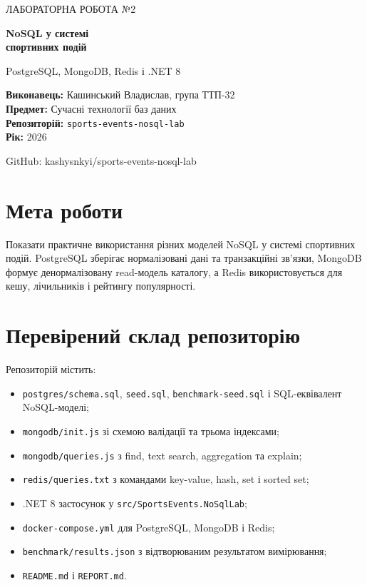 \documentclass[12pt,a4paper]{article}
\begin{document}
\begin{titlepage}
\centering
\vspace*{2.5cm}
{\color{blue}\Large ЛАБОРАТОРНА РОБОТА №2\par}
\vspace{0.8cm}
{\color{navy}\Huge\bfseries NoSQL у системі\\[0.2cm] спортивних подій\par}
\vspace{1.2cm}
{\large PostgreSQL, MongoDB, Redis і .NET 8\par}
\vfill
\begin{flushleft}
\textbf{Виконавець:} Кашинський Владислав, група ТТП-32\\[0.4cm]
\textbf{Предмет:} Сучасні технології баз даних\\[0.4cm]
\textbf{Репозиторій:} \texttt{sports-events-nosql-lab}\\[0.4cm]
\textbf{Рік:} 2026
\end{flushleft}
\vfill
{\color{navy}\large GitHub: kashysnkyi/sports-events-nosql-lab\par}
\end{titlepage}

\section{Мета роботи}

Показати практичне використання різних моделей NoSQL у системі спортивних подій. PostgreSQL зберігає нормалізовані дані та транзакційні зв'язки, MongoDB формує денормалізовану read-модель каталогу, а Redis використовується для кешу, лічильників і рейтингу популярності.

\section{Перевірений склад репозиторію}

Репозиторій містить:

\begin{itemize}
\item \texttt{postgres/schema.sql}, \texttt{seed.sql}, \texttt{benchmark-seed.sql} і SQL-еквівалент NoSQL-моделі;
\item \texttt{mongodb/init.js} зі схемою валідації та трьома індексами;
\item \texttt{mongodb/queries.js} з find, text search, aggregation та explain;
\item \texttt{redis/queries.txt} з командами key-value, hash, set і sorted set;
\item .NET 8 застосунок у \texttt{src/SportsEvents.NoSqlLab};
\item \texttt{docker-compose.yml} для PostgreSQL, MongoDB і Redis;
\item \texttt{benchmark/results.json} з відтворюваним результатом вимірювання;
\item \texttt{README.md} і \texttt{REPORT.md}.
\end{itemize}
\end{document}
